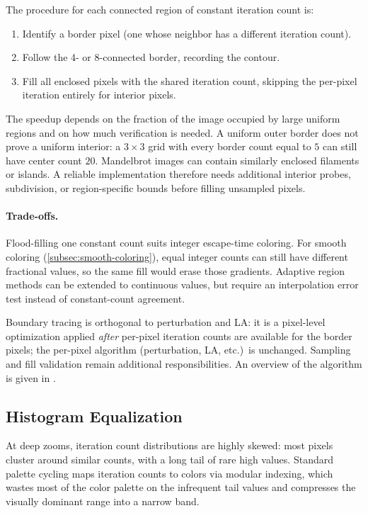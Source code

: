 The procedure for each connected region of constant iteration count is:
\begin{enumerate}
  \item Identify a border pixel (one whose neighbor has a different
        iteration count).
  \item Follow the 4- or 8-connected border, recording the contour.
  \item Fill all enclosed pixels with the shared iteration count,
        skipping the per-pixel iteration entirely for interior pixels.
\end{enumerate}

The speedup depends on the fraction of the image occupied by large uniform
regions and on how much verification is needed.  A uniform outer border does
not prove a uniform interior: a $3\times3$ grid with every border count equal
to $5$ can still have center count $20$.  Mandelbrot images can contain
similarly enclosed filaments or islands.  A reliable implementation therefore
needs additional interior probes, subdivision, or region-specific bounds
before filling unsampled pixels.

\paragraph{Trade-offs.}
Flood-filling one constant count suits integer escape-time coloring.
For smooth coloring (\cref{subsec:smooth-coloring}), equal integer counts
can still have different fractional values, so the same fill would erase
those gradients.  Adaptive region methods can be extended to continuous
values, but require an interpolation error test instead of constant-count
agreement.

Boundary tracing is orthogonal to perturbation and LA: it is a
pixel-level optimization applied \emph{after} per-pixel iteration counts
are available for the border pixels; the per-pixel algorithm
(perturbation, LA, etc.)\ is unchanged.  Sampling and fill validation remain
additional responsibilities.  An overview of the algorithm is given in
\cite{WikipediaPlottingAlgorithms}.

\subsection{Histogram Equalization}
\label{subsec:histogram-equalization}

At deep zooms, iteration count distributions are highly skewed: most
pixels cluster around similar counts, with a long tail of rare high
values.  Standard palette cycling maps iteration counts to colors via
modular indexing, which wastes most of the color palette on the
infrequent tail values and compresses the visually dominant range into a
narrow band.


